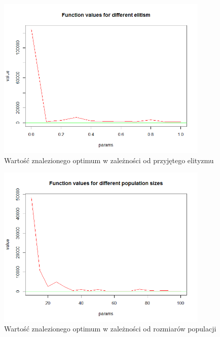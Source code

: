 \documentclass[11pt, a4paper]{article}
\begin{document}
\begin{figure}[H]
	\begin{center}
		\includegraphics[width=0.9\textwidth]{./assets/PriceTransistor4.png} %
		\caption{Wartość znalezionego optimum w zależności od przyjętego elityzmu}
		\label{fig:gulf7}
	\end{center}
\end{figure}
\begin{figure}[H]
	\begin{center}
		\includegraphics[width=0.9\textwidth]{./assets/PriceTransistor5.png} %
		\caption{Wartość znalezionego optimum w zależności od rozmiarów populacji}
		\label{fig:gulf7}
	\end{center}
\end{figure}
\end{document}

